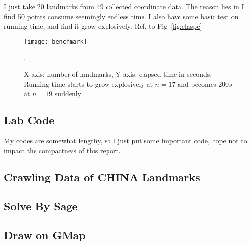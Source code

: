 \documentclass{mcmthesis}
\begin{document}
I just take 20 landmarks from 49 collected coordinate data. The reason lies in I find 50 points consume seemingly endless time. I also have some basic test on running time, and find it grow explosively. Ref. to Fig~\vref{fig:elaspe}

\begin{figure}[h]
	\centering
	\texttt{[image: benchmark]}
	\caption[Running time]{X-axis: number of landmarks, Y-axis: elapsed time in seconds. Running time starts to grow explosively at $n=17$ and becomes $200s$  at  $n=19$  suddenly}
	\label{fig:elaspe}.
\end{figure}
		

\begin{appendices}
\section{Lab Code}
My codes are somewhat lengthy, so I just put some important code, hope not to impact the compactness of this report.
	\subsection{Crawling Data of CHINA Landmarks}
	
	\subsection{Solve By Sage}
	
	\subsection{Draw on GMap}
		
	
	
%					
\end{appendices}

	
\end{document}
